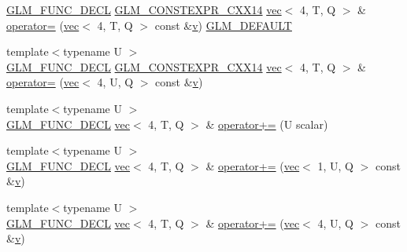 \begin{DoxyCompactItemize}
\mbox{\hyperlink{setup_8hpp_ab2d052de21a70539923e9bcbf6e83a51}{G\+L\+M\+\_\+\+F\+U\+N\+C\+\_\+\+D\+E\+CL}} \mbox{\hyperlink{setup_8hpp_a4dd12abf5e1164bc57f3a34671d03844}{G\+L\+M\+\_\+\+C\+O\+N\+S\+T\+E\+X\+P\+R\+\_\+\+C\+X\+X14}} \mbox{\hyperlink{structglm_1_1vec}{vec}}$<$ 4, T, Q $>$ \& \mbox{\hyperlink{structglm_1_1vec_3_014_00_01_t_00_01_q_01_4_aecb1fc48895abb231dc7bd64a941ec51}{operator=}} (\mbox{\hyperlink{structglm_1_1vec}{vec}}$<$ 4, T, Q $>$ const \&\mbox{\hyperlink{_s_d_l__opengl_8h_a10a82eabcb59d2fcd74acee063775f90}{v}}) \mbox{\hyperlink{setup_8hpp_aefce7051c376a64ba89fa93a9f63bc2c}{G\+L\+M\+\_\+\+D\+E\+F\+A\+U\+LT}}
\item 
{\footnotesize template$<$typename U $>$ }\\\mbox{\hyperlink{setup_8hpp_ab2d052de21a70539923e9bcbf6e83a51}{G\+L\+M\+\_\+\+F\+U\+N\+C\+\_\+\+D\+E\+CL}} \mbox{\hyperlink{setup_8hpp_a4dd12abf5e1164bc57f3a34671d03844}{G\+L\+M\+\_\+\+C\+O\+N\+S\+T\+E\+X\+P\+R\+\_\+\+C\+X\+X14}} \mbox{\hyperlink{structglm_1_1vec}{vec}}$<$ 4, T, Q $>$ \& \mbox{\hyperlink{structglm_1_1vec_3_014_00_01_t_00_01_q_01_4_a48ac928cee66a63093353f54d915e223}{operator=}} (\mbox{\hyperlink{structglm_1_1vec}{vec}}$<$ 4, U, Q $>$ const \&\mbox{\hyperlink{_s_d_l__opengl_8h_a10a82eabcb59d2fcd74acee063775f90}{v}})
\item 
{\footnotesize template$<$typename U $>$ }\\\mbox{\hyperlink{setup_8hpp_ab2d052de21a70539923e9bcbf6e83a51}{G\+L\+M\+\_\+\+F\+U\+N\+C\+\_\+\+D\+E\+CL}} \mbox{\hyperlink{structglm_1_1vec}{vec}}$<$ 4, T, Q $>$ \& \mbox{\hyperlink{structglm_1_1vec_3_014_00_01_t_00_01_q_01_4_a51ba1da558471cb6e2bc8f3870b88db5}{operator+=}} (U scalar)
\item 
{\footnotesize template$<$typename U $>$ }\\\mbox{\hyperlink{setup_8hpp_ab2d052de21a70539923e9bcbf6e83a51}{G\+L\+M\+\_\+\+F\+U\+N\+C\+\_\+\+D\+E\+CL}} \mbox{\hyperlink{structglm_1_1vec}{vec}}$<$ 4, T, Q $>$ \& \mbox{\hyperlink{structglm_1_1vec_3_014_00_01_t_00_01_q_01_4_a1f72eb246038606882fc1baf40752008}{operator+=}} (\mbox{\hyperlink{structglm_1_1vec}{vec}}$<$ 1, U, Q $>$ const \&\mbox{\hyperlink{_s_d_l__opengl_8h_a10a82eabcb59d2fcd74acee063775f90}{v}})
\item 
{\footnotesize template$<$typename U $>$ }\\\mbox{\hyperlink{setup_8hpp_ab2d052de21a70539923e9bcbf6e83a51}{G\+L\+M\+\_\+\+F\+U\+N\+C\+\_\+\+D\+E\+CL}} \mbox{\hyperlink{structglm_1_1vec}{vec}}$<$ 4, T, Q $>$ \& \mbox{\hyperlink{structglm_1_1vec_3_014_00_01_t_00_01_q_01_4_a0ecc88837b973bdf129d60381e6e481c}{operator+=}} (\mbox{\hyperlink{structglm_1_1vec}{vec}}$<$ 4, U, Q $>$ const \&\mbox{\hyperlink{_s_d_l__opengl_8h_a10a82eabcb59d2fcd74acee063775f90}{v}})

\end{DoxyCompactItemize}
